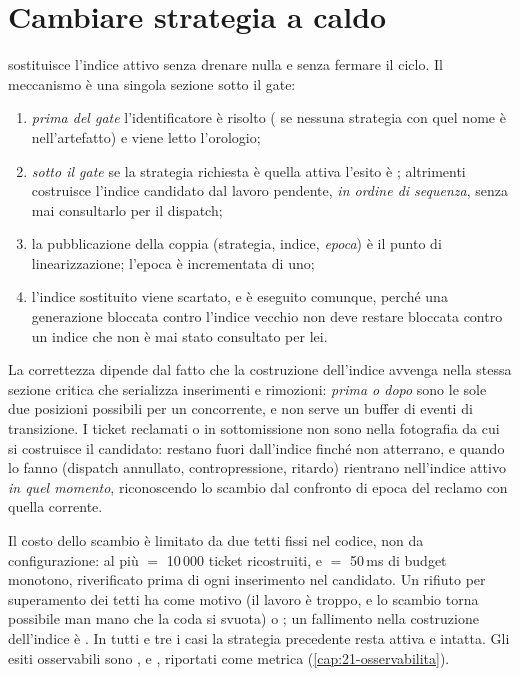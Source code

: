 \section{Cambiare strategia a caldo}
\label{sec:09-switch}

 sostituisce l'indice attivo senza drenare
nulla e senza fermare il ciclo. Il meccanismo \`e una singola sezione sotto il gate:

\begin{enumerate}[leftmargin=*]
  \item \emph{prima del gate} l'identificatore \`e risolto (
  se nessuna strategia con quel nome \`e nell'artefatto) e viene letto l'orologio;
  \item \emph{sotto il gate} se la strategia richiesta \`e quella attiva l'esito \`e
  ; altrimenti  costruisce l'indice candidato dal lavoro
  pendente, \emph{in ordine di sequenza}, senza mai consultarlo per il dispatch;
  \item la pubblicazione della coppia (strategia, indice, \emph{epoca}) \`e il punto
  di linearizzazione; l'epoca \`e incrementata di uno;
  \item l'indice sostituito viene scartato, e  \`e eseguito comunque,
  perch\'e una generazione bloccata contro l'indice vecchio non deve restare bloccata
  contro un indice che non \`e mai stato consultato per lei.
\end{enumerate}

La correttezza dipende dal fatto che la costruzione dell'indice avvenga
nella stessa sezione critica che serializza inserimenti e rimozioni: \emph{prima o
dopo} sono le sole due posizioni possibili per un  concorrente, e non
serve un buffer di eventi di transizione. I ticket reclamati o in sottomissione non sono nella fotografia da cui si costruisce il candidato: restano fuori dall'indice finch\'e non atterrano, e quando lo fanno (dispatch annullato, contropressione, ritardo) rientrano nell'indice attivo \emph{in quel momento}, riconoscendo lo scambio dal confronto di epoca del reclamo con quella corrente.

Il costo dello scambio \`e limitato da due tetti fissi nel codice, non da
configurazione: al pi\`u  $=$ 10\,000 ticket
ricostruiti, e  $=$ 50\,ms di budget monotono, riverificato
prima di ogni inserimento nel candidato. Un rifiuto per superamento dei tetti ha
come motivo  (il lavoro \`e troppo, e lo scambio torna possibile
man mano che la coda si svuota) o ; un fallimento nella costruzione
dell'indice \`e . In tutti e tre i casi la strategia precedente
resta attiva e intatta. Gli esiti osservabili sono ,  e
, riportati come metrica (\cref{cap:21-osservabilita}).

